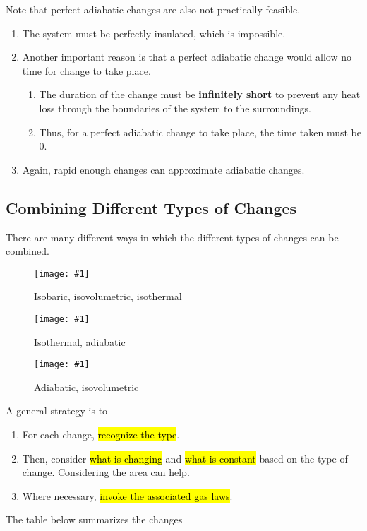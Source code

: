 \documentclass[a4paper,12pt]{article}
\newcommand{\img}[4]{\begin{center}
  \begin{figure}[H]
    \centering
    \texttt{[image: \#1]}
    \caption{#3}
    \label{fig:#4}
  \end{figure}
\end{center}}
\newcommand{\tripleimg}[9]{
  \begin{minipage}{0.3\textwidth}
    \img{#1}{1}{#2}{#3}
  \end{minipage}%
  \hspace*{0.05\textwidth}%
  \begin{minipage}{0.3\textwidth}
    \img{#4}{1}{#5}{#6}
  \end{minipage}%
  \hspace*{0.05\textwidth}%
  \begin{minipage}{0.3\textwidth}
    \img{#7}{1}{#8}{#9}
  \end{minipage}%
}
\begin{document}
Note that perfect adiabatic changes are also not practically feasible.
\begin{enumerate}
  \item The system must be perfectly insulated, which is impossible.
  \item Another important reason is that a perfect adiabatic change would allow no time for change to take place.
        \begin{enumerate}
          \item The duration of the change must be \textbf{infinitely short} to prevent any heat loss through the boundaries of the system to the surroundings.
          \item Thus, for a perfect adiabatic change to take place, the time taken must be 0.
        \end{enumerate}
  \item Again, rapid enough changes can approximate adiabatic changes.
\end{enumerate}

\subsection{Combining Different Types of Changes}

There are many different ways in which the different types of changes can be combined.

\tripleimg%
{combined0.png}{Isobaric, isovolumetric, isothermal}{combined0}%
{combined1.png}{Isothermal, adiabatic}{combined1}%
{combined2.png}{Adiabatic, isovolumetric}{combined2}

A general strategy is to
\begin{enumerate}
  \item For each change, \hl{recognize the type}.
  \item Then, consider \hl{what is changing} and \hl{what is constant} based on the type of change. Considering the area can help.
  \item Where necessary, \hl{invoke the associated gas laws}.
\end{enumerate}

The table below summarizes the changes
\end{document}
